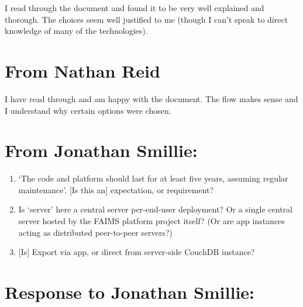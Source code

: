 \documentclass[a4paper,headings=small fontsize=10pt]{scrreprt}
\begin{document}
I read through the document and found it to be very well explained and
thorough. The choices seem well justified to me (though I can't speak to
direct knowledge of many of the technologies).

\section{From Nathan Reid}

I have read through and am happy with the document. The flow makes sense
and I understand why certain options were chosen.

\section{From Jonathan Smillie:}

 \begin{enumerate}
  \def\labelenumii{\alph{enumii}.}
  
\item `The code and platform should last for at least five years, assuming 
   regular maintenance'. {[}Is this an{]} expectation, or requirement?

\item Is `server' here a central server per-end-user deployment? Or a single 
   central server hosted by the FAIMS platform project itself? 
   (Or are app instances acting as distributed peer-to-peer servers?)

\item {[}Is{]} Export via app, or direct from server-side CouchDB instance?

\end{enumerate}

\section{Response to Jonathan Smillie:}
\end{document}
